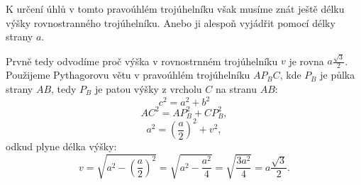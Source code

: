 \documentclass[12pt,a4paper]{article}
\begin{document}
K určení úhlů v tomto pravoúhlém trojúhelníku však musíme znát ještě délku výšky rovnostranného trojúhelníku.
Anebo ji alespoň vyjádřit pomocí délky strany $a$.

\bigskip
Prvně tedy odvodíme proč výška v rovnostrnném trojúhelníku $v$ je rovna $a\frac{\sqrt{3}}{2}$.
Použijeme Pythagorovu větu v pravoúhlém trojúhelníku $AP_BC$, kde $P_B$ je půlka strany $AB$, tedy $P_B$ je patou výšky z vrcholu $C$ na stranu $AB$:
\[c^2 = a^2 + b^2\]
\[AC^2 = AP_B^2 + CP_B^2,\]
\[a^2 = \left(\frac{a}{2}\right)^2 + v^2,\]
odkud plyne délka výšky:
\[v = \sqrt{a^2 - \left(\frac{a}{2}\right)^2} = \sqrt{a^2 - \frac{a^2}{4}} = \sqrt{\frac{3a^2}{4}} = a\frac{\sqrt{3}}{2}.\]

\begin{center}
\end{center}
\end{document}
